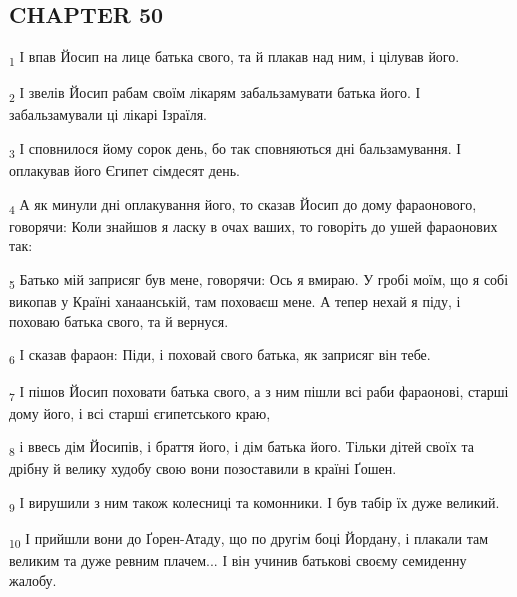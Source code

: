 \subsection{CHAPTER 50}
\begin{tcolorbox}
\textsubscript{1} І впав Йосип на лице батька свого, та й плакав над ним, і цілував його.
\end{tcolorbox}
\begin{tcolorbox}
\textsubscript{2} І звелів Йосип рабам своїм лікарям забальзамувати батька його. І забальзамували ці лікарі Ізраїля.
\end{tcolorbox}
\begin{tcolorbox}
\textsubscript{3} І сповнилося йому сорок день, бо так сповняються дні бальзамування. І оплакував його Єгипет сімдесят день.
\end{tcolorbox}
\begin{tcolorbox}
\textsubscript{4} А як минули дні оплакування його, то сказав Йосип до дому фараонового, говорячи: Коли знайшов я ласку в очах ваших, то говоріть до ушей фараонових так:
\end{tcolorbox}
\begin{tcolorbox}
\textsubscript{5} Батько мій заприсяг був мене, говорячи: Ось я вмираю. У гробі моїм, що я собі викопав у Країні ханаанській, там поховаєш мене. А тепер нехай я піду, і поховаю батька свого, та й вернуся.
\end{tcolorbox}
\begin{tcolorbox}
\textsubscript{6} І сказав фараон: Піди, і поховай свого батька, як заприсяг він тебе.
\end{tcolorbox}
\begin{tcolorbox}
\textsubscript{7} І пішов Йосип поховати батька свого, а з ним пішли всі раби фараонові, старші дому його, і всі старші єгипетського краю,
\end{tcolorbox}
\begin{tcolorbox}
\textsubscript{8} і ввесь дім Йосипів, і браття його, і дім батька його. Тільки дітей своїх та дрібну й велику худобу свою вони позоставили в країні Ґошен.
\end{tcolorbox}
\begin{tcolorbox}
\textsubscript{9} І вирушили з ним також колесниці та комонники. І був табір їх дуже великий.
\end{tcolorbox}
\begin{tcolorbox}
\textsubscript{10} І прийшли вони до Ґорен-Атаду, що по другім боці Йордану, і плакали там великим та дуже ревним плачем... І він учинив батькові своєму семиденну жалобу.
\end{tcolorbox}
